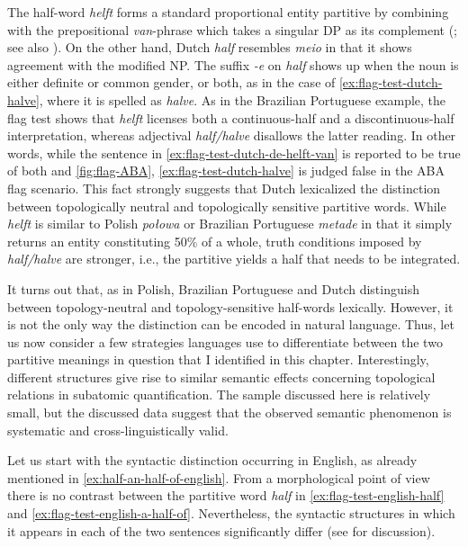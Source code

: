 The half-word \textit{helft} forms a standard proportional entity partitive by combining with the prepositional \textit{van}-phrase which takes a singular DP as its complement (\citealt{de_hoop1997semantic,de_hoop2003partitivity}; see also \citealt[pp. 16--18]{cleven2013syntax}). On the other hand, Dutch \textit{half} resembles \textit{meio} in that it shows agreement with the modified NP. The suffix \textit{-e} on \textit{half} shows up when the noun is either definite or common gender, or both, as in the case of \ref{ex:flag-test-dutch-halve}, where it is spelled as \textit{halve}. As in the Brazilian Portuguese example, the flag test shows that \textit{helft} licenses both a continuous-half and a discontinuous-half interpretation, whereas adjectival \textit{half/halve} disallows the latter reading. In other words, while the sentence in \ref{ex:flag-test-dutch-de-helft-van} is reported to be true of both  and \ref{fig:flag-ABA}, \ref{ex:flag-test-dutch-halve} is judged false in the ABA flag scenario. This fact strongly suggests that Dutch lexicalized the distinction between topologically neutral and topologically sensitive partitive words. While \textit{helft} is similar to Polish \textit{połowa} or Brazilian Portuguese \textit{metade} in that it simply returns an entity constituting 50\% of a whole, truth conditions imposed by \textit{half/halve} are stronger, i.e., the partitive yields a half that needs to be integrated.  

It turns out that, as in Polish, Brazilian Portuguese and Dutch distinguish between topology-neutral and topology-sensitive half-words lexically. However, it is not the only way the distinction can be encoded in natural language. Thus, let us now consider a few strategies languages use to differentiate between the two partitive meanings in question that I identified in this chapter. Interestingly, different structures give rise to similar semantic effects concerning topological relations in subatomic quantification. The sample discussed here is relatively small, but the discussed data suggest that the observed semantic phenomenon is systematic and cross-linguistically valid. 

Let us start with the syntactic distinction occurring in English, as already mentioned in \ref{ex:half-an-half-of-english}. From a morphological point of view there is no contrast between the partitive word \textit{half} in \ref{ex:flag-test-english-half} and \ref{ex:flag-test-english-a-half-of}. Nevertheless, the syntactic structures in which it appears in each of the two sentences significantly differ (see \citealt{vannestal2004syntactic} for discussion). 
		
